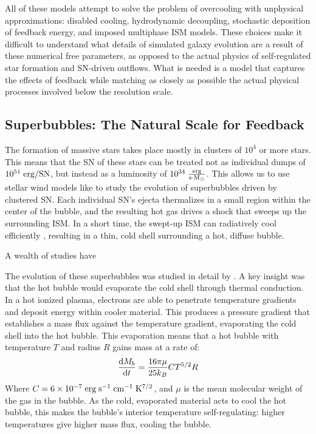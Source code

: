 All of these models attempt to solve the problem of overcooling with unphysical
approximations: disabled cooling, hydrodynamic decoupling, stochastic deposition
of feedback energy, and imposed multiphase ISM models.  These choices make it
difficult to understand what details of simulated galaxy evolution are a result
of these numerical free parameters, as opposed to the actual physics of
self-regulated star formation and SN-driven outflows.  What is needed is a model that
captures the effects of feedback while matching as closely as possible the
actual physical processes involved below the resolution scale.

\subsection{Superbubbles: The Natural Scale for Feedback}
The formation of massive stars takes place mostly in clusters of $10^4$ or more
stars.  This means that the SN of these stars can be treated not as
individual dumps of $10^{51}\;\rm{erg/SN}$, but instead as a luminosity of
$10^{34}\;\rm{\frac{erg}{s \cdot M_\odot}}$.  This allows us to use stellar wind
models like \citet{Weaver1977} to study the evolution of superbubbles driven by
clustered SN.  Each individual SN's ejecta thermalizes in a small
region within the center of the bubble, and the resulting hot gas drives a shock
that sweeps up the surrounding ISM.  In a short time, the swept-up ISM can
radiatively cool efficiently , resulting in a thin, cold shell surrounding a
hot, diffuse bubble.

A wealth of studies have

The evolution of these superbubbles was studied in detail by \citet{MacLow1988}.
A key insight was that the hot bubble would evaporate the cold shell through
thermal conduction.  In a hot ionized plasma, electrons are able to penetrate
temperature gradients and deposit energy within cooler material.  This produces
a pressure gradient that establishes a mass flux against the temperature
gradient, evaporating the cold shell into the hot bubble.  This
evaporation means that a hot bubble with temperature $T$ and radius $R$ gains
mass at a rate of:
\begin{equation}
    \frac{{\rm d }M_b}{{\rm d}t} = \frac{16\pi\mu}{25k_B} CT^{5/2}R
\end{equation}
Where $C=6\times10^{-7}\;\rm{erg\;s^{-1}\;cm^{-1}\;K^{7/2}}$, and $\mu$ is the
mean molecular weight of the gas in the bubble.  As the cold, evaporated
material acts to cool the hot bubble, this makes the bubble's interior
temperature self-regulating: higher temperatures give higher mass flux, cooling
the bubble.

